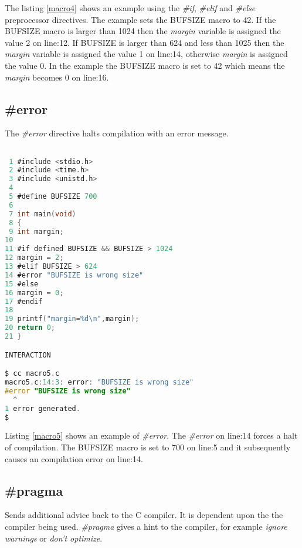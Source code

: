 The listing \ref{macro4} shows an example using the \textit{\#if}, \textit{\#elif} and \textit{\#else} preprocessor directives. The example sets the BUFSIZE macro to 42. If the BUFSIZE macro is larger than 1024 then the \textit{margin} variable is assigned the value 2 on line:12. If BUFSIZE is larger than 624 and less than 1025 then the \textit{margin} variable is assigned the value 1 on line:14, otherwise \textit{margin} is assigned the value 0. In the example the BUFSIZE macro is set to 42 which means the \textit{margin} becomes 0 on line:16.

\subsection{\#error}


The \textit{\#error} directive halts compilation with an error message.

\begin{lstlisting}[language=C,showstringspaces=false, caption={File macro5.c, using \#if, \#else, \#error and \#endif},captionpos=b,label=macro5]

 1 #include <stdio.h>
 2 #include <time.h>
 3 #include <unistd.h>
 4 
 5 #define BUFSIZE 700
 6 
 7 int main(void)
 8 {
 9 int margin;
10 
11 #if defined BUFSIZE && BUFSIZE > 1024
12 margin = 2;
13 #elif BUFSIZE > 624
14 #error "BUFSIZE is wrong size"
15 #else
16 margin = 0;
17 #endif
18 
19 printf("margin=%d\n",margin);
20 return 0;
21 }

INTERACTION 

$ cc macro5.c
macro5.c:14:3: error: "BUFSIZE is wrong size"
#error "BUFSIZE is wrong size"
  ^
1 error generated.
$  

\end{lstlisting}

Listing \ref{macro5} shows an example of \textit{\#error}. The \textit{\#error} on line:14 forces a halt of compilation. The BUFSIZE macro is set to 700 on line:5 and it subsequently causes an compilation error on line:14.

\subsection{\#pragma}



Sends additional advice back to the C compiler. It is dependent upon the the compiler being used. \textit{\#pragma} gives a hint to the compiler, for example \textit{ignore warnings} or \textit{don't optimize}. 

 

